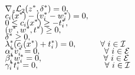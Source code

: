 \begin{solution}
    \tightalignbreak
    \vspace{-6mm}\begin{align}
        &\grad_z \scL_2(z\star, \delta\star) = 0,                                     \label{KKT1}\\[-1.5ex]
        &c_i(x\star) -(v_i\star - w_i\star) = 0,                                      \label{KKT2}\\[-1.5ex]
        &0 \leq c_i(x\star) \geq - t_i\star,                                          \label{KKT3}\\[-1.5ex]
        &(v\star, w\star, t\star) \geq 0,                                             \label{KKT4}\\[-1.5ex]
        &\delta\star \geq 0,                                                          \label{KKT5}\\[-1.5ex]
        &\lm_i\star(c_i(x\star) + t_i\star) = 0,         \hspace{10mm}\forall \ i \in \scI \label{KKT6}\\[-1.5ex]
        &\alpha_i\star v_i\star = 0,                \hspace{27mm}\forall \ i \in \scE \label{KKT7}\\[-1.5ex]
        &\beta_i\star w_i\star = 0,                 \hspace{26mm}\forall \ i \in \scE \label{KKT8}\\[-1.5ex]
        &\gamma_i\star t_i\star = 0,                \hspace{28mm}\forall \ i \in \scI \label{KKT9}
    \end{align}
    \vspace{-15mm}\alignbreak


\end{solution}
